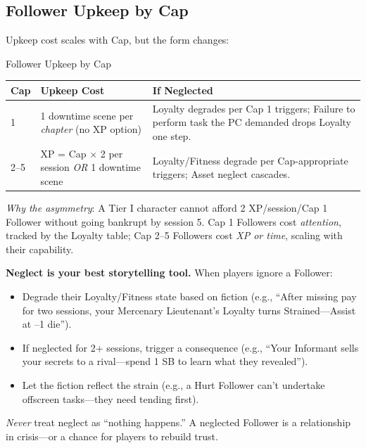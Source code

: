 \subsection{Follower Upkeep by Cap}
Upkeep cost scales with Cap, but the form changes:

\begin{gmtable}{Follower Upkeep by Cap}
\centering
\small
\begin{tabularx}{\linewidth}{@{}lXl@{}}
\toprule
\textbf{Cap} & \textbf{Upkeep Cost} & \textbf{If Neglected} \\
\midrule
1 & 1 downtime scene per \emph{chapter} (no XP option) & Loyalty degrades per Cap 1 triggers; Failure to perform task the PC demanded drops Loyalty one step. \\
2--5 & XP = Cap $\times$ 2 per session \emph{OR} 1 downtime scene & Loyalty/Fitness degrade per Cap-appropriate triggers; Asset neglect cascades. \\
\bottomrule
\end{tabularx}
\tcblower
\small\textit{Why the asymmetry}: A Tier I character cannot afford 2 XP/session/Cap 1 Follower without going bankrupt by session 5. Cap 1 Followers cost \textit{attention}, tracked by the Loyalty table; Cap 2--5 Followers cost \textit{XP or time}, scaling with their capability.
\end{gmtable}

\begin{tcolorbox}[colback=blue!5!white,colframe=blue!75!black,title={GM Tip: The Follower Neglect Engine},breakable]
\textbf{Neglect is your best storytelling tool.} When players ignore a Follower:  
\begin{itemize}
  \item Degrade their Loyalty/Fitness state based on fiction (e.g., ``After missing pay for two sessions, your Mercenary Lieutenant's Loyalty turns Strained---Assist at --1 die'').  
  \item If neglected for 2+ sessions, trigger a consequence (e.g., ``Your Informant sells your secrets to a rival---spend 1 SB to learn what they revealed'').  
  \item Let the fiction reflect the strain (e.g., a Hurt Follower can't undertake offscreen tasks---they need tending first).  
\end{itemize}
\textit{Never} treat neglect as ``nothing happens.'' A neglected Follower is a relationship in crisis---or a chance for players to rebuild trust.
\end{tcolorbox}

